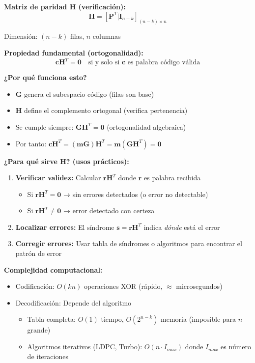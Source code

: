 \documentclass[10pt,a4paper]{article}
\begin{document}
\textbf{Matriz de paridad $\mathbf{H}$ (verificación):}
$$\mathbf{H} = [\mathbf{P}^T | \mathbf{I}_{n-k}]_{(n-k) \times n}$$

Dimensión: $(n-k)$ filas, $n$ columnas

\textbf{Propiedad fundamental (ortogonalidad):}
$$\boxed{\mathbf{c}\mathbf{H}^T = \mathbf{0} \quad \text{si y solo si } \mathbf{c} \text{ es palabra código válida}}$$

\textbf{¿Por qué funciona esto?} 
\begin{itemize}
\item $\mathbf{G}$ genera el subespacio código (filas son base)
\item $\mathbf{H}$ define el complemento ortogonal (verifica pertenencia)
\item Se cumple siempre: $\mathbf{G}\mathbf{H}^T = \mathbf{0}$ (ortogonalidad algebraica)
\item Por tanto: $\mathbf{c}\mathbf{H}^T = (\mathbf{m}\mathbf{G})\mathbf{H}^T = \mathbf{m}(\mathbf{G}\mathbf{H}^T) = \mathbf{0}$
\end{itemize}

\textbf{¿Para qué sirve $\mathbf{H}$? (usos prácticos):}
\begin{enumerate}
\item \textbf{Verificar validez:} Calcular $\mathbf{r}\mathbf{H}^T$ donde $\mathbf{r}$ es palabra recibida
  \begin{itemize}
  \item Si $\mathbf{r}\mathbf{H}^T = \mathbf{0}$ → sin errores detectados (o error no detectable)
  \item Si $\mathbf{r}\mathbf{H}^T \neq \mathbf{0}$ → error detectado con certeza
  \end{itemize}
\item \textbf{Localizar errores:} El síndrome $\mathbf{s} = \mathbf{r}\mathbf{H}^T$ indica \emph{dónde} está el error
\item \textbf{Corregir errores:} Usar tabla de síndromes o algoritmos para encontrar el patrón de error
\end{enumerate}

\textbf{Complejidad computacional:}
\begin{itemize}
\item Codificación: $O(kn)$ operaciones XOR (rápido, $\approx$ microsegundos)
\item Decodificación: Depende del algoritmo
  \begin{itemize}
  \item Tabla completa: $O(1)$ tiempo, $O(2^{n-k})$ memoria (imposible para $n$ grande)
  \item Algoritmos iterativos (LDPC, Turbo): $O(n \cdot I_{max})$ donde $I_{max}$ es número de iteraciones
  \end{itemize}
\end{itemize}
\end{document}
